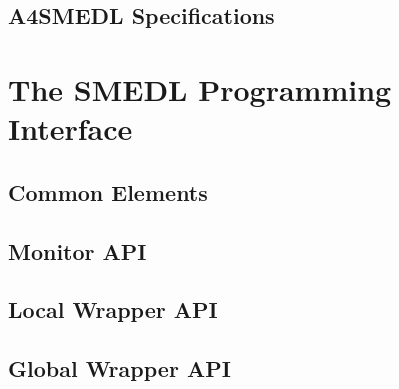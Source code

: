 \documentclass[paper=letter]{scrreport}
\begin{document}

\chapter{A4SMEDL Specifications}
\label{ch:a4smedl}





\part{The SMEDL Programming Interface}
\label{part:api}


\chapter{Common Elements}


\chapter{Monitor API}


\chapter{Local Wrapper API}


\chapter{Global Wrapper API}
\end{document}
